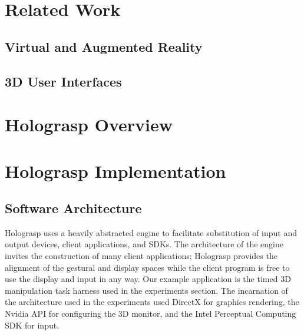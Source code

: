 \documentclass[pageno]{jpaper}
\begin{document}
\section{Related Work}
\subsection{Virtual and Augmented Reality}
\subsection{3D User Interfaces}
\section{Holograsp Overview}
\section{Holograsp Implementation}
\subsection{Software Architecture}
Holograsp uses a heavily abstracted engine to facilitate substitution of input and output devices, client applications, and SDKs.
The architecture of the engine invites the construction of many client applications; Holograsp provides the alignment of the
gestural and display spaces while the client program is free to use the display and input in any way. Our example application
is the timed 3D manipulation task harness used in the experiments section. The incarnation of the architecture used in the
experiments used DirectX for graphics rendering, the Nvidia API for configuring the 3D monitor, and the Intel Perceptual
Computing SDK for input.
\end{document}
